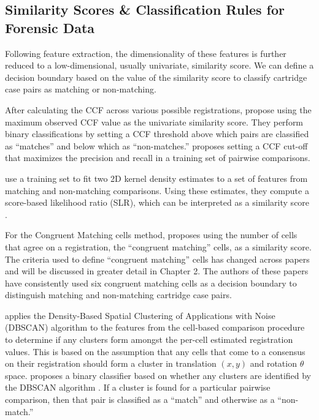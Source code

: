\documentclass[11pt,]{isuthesis}
\begin{document}
\hypertarget{similarity-scores-classification-rules-for-forensic-data}{%
\subsection{Similarity Scores \& Classification Rules for Forensic Data}\label{similarity-scores-classification-rules-for-forensic-data}}

Following feature extraction, the dimensionality of these features is further reduced to a low-dimensional, usually univariate, similarity score.
We can define a decision boundary based on the value of the similarity score to classify cartridge case pairs as matching or non-matching.

After calculating the CCF across various possible registrations, \citet{tai_fully_2018} propose using the maximum observed CCF value as the univariate similarity score.
They perform binary classifications by setting a CCF threshold above which pairs are classified as ``matches'' and below which as ``non-matches.''
\citet{Tai2019} proposes setting a CCF cut-off that maximizes the precision and recall in a training set of pairwise comparisons.

\citet{Riva2016,Riva2020} use a training set to fit two 2D kernel density estimates to a set of features from matching and non-matching comparisons.
Using these estimates, they compute a score-based likelihood ratio (SLR), which can be interpreted as a similarity score \citep{Garton2021}.

For the Congruent Matching cells method, \citet{song_proposed_2013} proposes using the number of cells that agree on a registration, the ``congruent matching'' cells, as a similarity score.
The criteria used to define ``congruent matching'' cells has changed across papers \citep{song_3d_2014,tong_fired_2014,tong_improved_2015,chen_convergence_2017} and will be discussed in greater detail in Chapter 2.
The authors of these papers have consistently used six congruent matching cells as a decision boundary to distinguish matching and non-matching cartridge case pairs.

\citet{Zhang2020} applies the Density-Based Spatial Clustering of Applications with Noise (DBSCAN) algorithm \citep{Ester1996} to the features from the cell-based comparison procedure to determine if any clusters form amongst the per-cell estimated registration values.
This is based on the assumption that any cells that come to a consensus on their registration should form a cluster in translation \((x,y)\) and rotation \(\theta\) space.
\citet{Zhang2020} proposes a binary classifier based on whether any clusters are identified by the DBSCAN algorithm \citep{Ester1996}.
If a cluster is found for a particular pairwise comparison, then that pair is classified as a ``match'' and otherwise as a ``non-match.''
\end{document}
